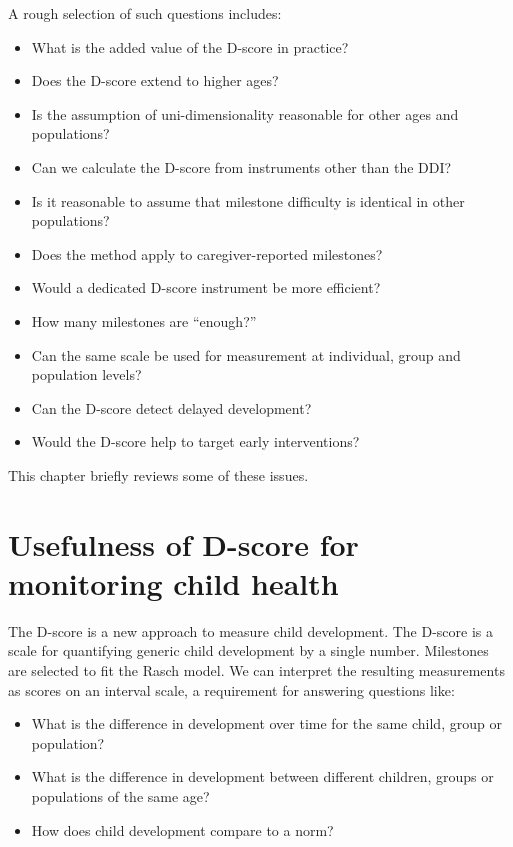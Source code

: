 \documentclass[
]{book}
\providecommand{\tightlist}{%
  \setlength{\itemsep}{0pt}\setlength{\parskip}{0pt}}
\begin{document}
A rough selection of such questions includes:

\begin{itemize}
\tightlist
\item
  What is the added value of the D-score in practice?
\item
  Does the D-score extend to higher ages?
\item
  Is the assumption of uni-dimensionality reasonable for other ages and populations?
\item
  Can we calculate the D-score from instruments other than the DDI?
\item
  Is it reasonable to assume that milestone difficulty is identical in other populations?
\item
  Does the method apply to caregiver-reported milestones?
\item
  Would a dedicated D-score instrument be more efficient?
\item
  How many milestones are ``enough?''
\item
  Can the same scale be used for measurement at individual, group and population levels?
\item
  Can the D-score detect delayed development?
\item
  Would the D-score help to target early interventions?
\end{itemize}

This chapter briefly reviews some of these issues.

\hypertarget{usefulness-of-d-score-for-monitoring-child-health}{%
\section{Usefulness of D-score for monitoring child health}\label{usefulness-of-d-score-for-monitoring-child-health}}

The D-score is a new approach to measure child development. The D-score is a scale for quantifying generic child development by a single number. Milestones are selected to fit the Rasch model. We can interpret the resulting measurements as scores on an interval scale, a requirement for answering questions like:

\begin{itemize}
\item
  What is the difference in development over time for the same child, group or population?
\item
  What is the difference in development between different children, groups or populations of the same age?
\item
  How does child development compare to a norm?
\end{itemize}
\end{document}
